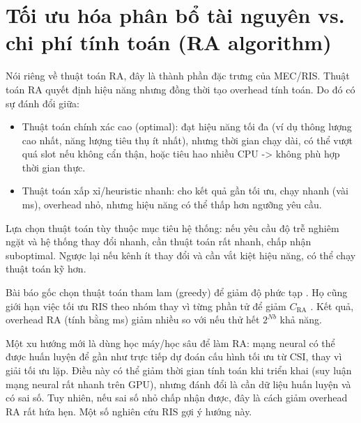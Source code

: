 \section{Tối ưu hóa phân bổ tài nguyên vs. chi phí tính toán (RA algorithm)}

Nói riêng về thuật toán RA, đây là thành phần đặc trưng của MEC/RIS. Thuật toán RA quyết định hiệu năng nhưng đồng thời tạo overhead tính toán. Do đó có sự đánh đổi giữa:

\begin{itemize}
    \item Thuật toán chính xác cao (optimal): đạt hiệu năng tối đa (ví dụ thông lượng cao nhất, năng lượng tiêu thụ ít nhất), nhưng thời gian chạy dài, có thể vượt quá slot nếu không cẩn thận, hoặc tiêu hao nhiều CPU -> không phù hợp thời gian thực.
    \item Thuật toán xấp xỉ/heuristic nhanh: cho kết quả gần tối ưu, chạy nhanh (vài ms), overhead nhỏ, nhưng hiệu năng có thể thấp hơn ngưỡng yêu cầu.
\end{itemize}

Lựa chọn thuật toán tùy thuộc mục tiêu hệ thống: nếu yêu cầu độ trễ nghiêm ngặt và hệ thống thay đổi nhanh, cần thuật toán rất nhanh, chấp nhận suboptimal. Ngược lại nếu kênh ít thay đổi và cần vắt kiệt hiệu năng, có thể chạy thuật toán kỹ hơn.

Bài báo gốc chọn thuật toán tham lam (greedy) để giảm độ phức tạp . Họ cũng giới hạn việc tối ưu RIS theo nhóm thay vì từng phần tử để giảm $C_\text{RA}$ . Kết quả, overhead RA (tính bằng ms) giảm nhiều so với nếu thử hết $2^{Nb}$ khả năng.

Một xu hướng mới là dùng học máy/học sâu để làm RA: mạng neural có thể được huấn luyện để gần như trực tiếp dự đoán cấu hình tối ưu từ CSI, thay vì giải tối ưu lặp. Điều này có thể giảm thời gian tính toán khi triển khai (suy luận mạng neural rất nhanh trên GPU), nhưng đánh đổi là cần dữ liệu huấn luyện và có sai số. Tuy nhiên, nếu sai số nhỏ chấp nhận được, đây là cách giảm overhead RA rất hứa hẹn. Một số nghiên cứu RIS gợi ý hướng này.